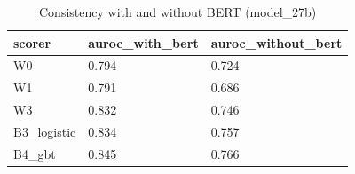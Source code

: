 \begin{table}[t]
\centering
\small
\begin{tabular}{lll}
\hline
scorer & auroc\_with\_bert & auroc\_without\_bert \\
\hline
W0 & 0.794 & 0.724 \\
W1 & 0.791 & 0.686 \\
W3 & 0.832 & 0.746 \\
B3\_logistic & 0.834 & 0.757 \\
B4\_gbt & 0.845 & 0.766 \\
\hline
\end{tabular}
\caption{Consistency with and without BERT (model\_27b)}
\label{tab:bert_model_27b}
\end{table}
